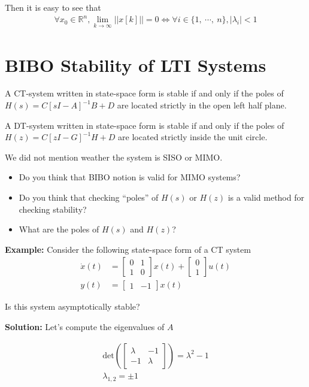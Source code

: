 \documentclass[twoside]{article}
\begin{document}
Then it is easy to see that
\begin{align*}
    \forall x_0 \in \mathbb{R}^n, \lim_{k \to \infty} || x[k] || = 0
    \iff \forall i \in \lbrace 1 , \ \cdots ,  \ n \rbrace, |
  \lambda_i | < 1
\end{align*}

\section*{BIBO Stability of LTI Systems}

A CT-system written in state-space form 
is stable if and only if the poles of $H(s) = C \left[ s I -
  A\right]^{-1} B + D$ are located strictly in the open left
half plane. 

A DT-system written in state-space form 
is stable if and only if the poles of $H(z) = C \left[ z I -
  G\right]^{-1} H + D$ are located strictly inside the
unit circle.

We did not mention weather the system is SISO or MIMO. 
%
\begin{itemize}
  \item Do you think that BIBO notion is valid for MIMO systems? 
  \item Do you think that checking ``poles'' of $H(s)$ or $H(z)$ is
    a valid method for checking stability?
    \item What are the poles of $H(s)$ and $H(z)$?
\end{itemize}

\textbf{Example:} Consider the following state-space form of a
CT system 
%
\begin{align*}
\dot{x}(t) &= 
\left[ \begin{array}{cc} 0 & 1 \\ 1 & 0 \end{array} \right]
x(t)
+
\left[ \begin{array}{c} 0 \\ 1 \end{array} \right] u(t)
\\
y(t) &= \left[ \begin{array}{cc} 1 & -1 \end{array} \right] x(t)
\end{align*}

Is this system asymptotically stable? 

\textbf{Solution:} Let's compute the eigenvalues of $A$

\begin{align*}
\mathrm{det} \left( \left[ \begin{array}{cc} \lambda & -1 \\ -1 &
                                                                  \lambda \end{array}
                                                                  \right]
                                                                  \right)
                                                                  =
                                                                  \lambda^2
                                                                  - 1
\\
\lambda_{1,2} = \pm 1
\end{align*}
\end{document}
